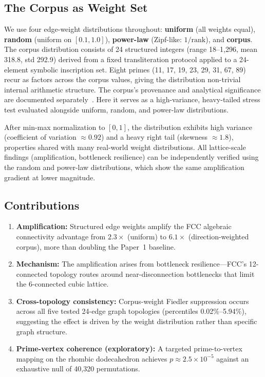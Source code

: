 \documentclass[11pt]{article}
\begin{document}
\subsection{The Corpus as Weight Set}
\label{sec:corpus}

We use four edge-weight distributions throughout: \textbf{uniform}
(all weights equal), \textbf{random} (uniform on $[0.1, 1.0]$),
\textbf{power-law} (Zipf-like: $1/\text{rank}$), and
\textbf{corpus}. The corpus distribution consists of 24 structured
integers (range 18--1{,}296, mean 318.8, std 292.9) derived from a fixed transliteration protocol applied to a 24-element
symbolic inscription set. Eight primes (11, 17, 19, 23, 29, 31, 67, 89)
recur as factors across the corpus values, giving the distribution
non-trivial internal arithmetic structure. The corpus's provenance
and analytical significance are documented
separately~\cite{bielec2026shape}. Here it serves as a high-variance,
heavy-tailed stress test evaluated alongside uniform, random, and
power-law distributions.

After min-max normalization to $[0,1]$, the distribution exhibits
high variance (coefficient of variation $\approx 0.92$) and a heavy
right tail (skewness $\approx 1.8$), properties shared with many
real-world weight distributions. All lattice-scale findings
(amplification, bottleneck resilience) can be independently verified
using the random and power-law distributions, which show the same
amplification gradient at lower magnitude.

\subsection{Contributions}

\begin{enumerate}
  \item \textbf{Amplification:} Structured edge weights amplify the
    FCC algebraic connectivity advantage from $2.3\times$ (uniform)
    to $6.1\times$ (direction-weighted corpus), more than doubling the
    Paper~1 baseline.
  \item \textbf{Mechanism:} The amplification arises from bottleneck
    resilience---FCC's 12-connected topology routes around
    near-disconnection bottlenecks that limit the 6-connected
    cubic lattice.
  \item \textbf{Cross-topology consistency:} Corpus-weight Fiedler
    suppression occurs across all five tested 24-edge graph topologies
    (percentiles 0.02\%--5.94\%), suggesting the effect is driven
    by the weight distribution rather than specific graph structure.
  \item \textbf{Prime-vertex coherence (exploratory):} A targeted prime-to-vertex
    mapping on the rhombic dodecahedron achieves $p \approx 2.5 \times 10^{-5}$
    against an exhaustive null of 40{,}320 permutations.
\end{enumerate}
\end{document}
